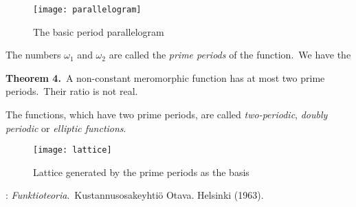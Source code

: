 \documentclass[12pt]{article}
\theoremstyle{definition}
\begin{document}
\begin{figure}
\begin{center}
\texttt{[image: parallelogram]}
\end{center}
\caption{The basic period parallelogram}
\end{figure}


The numbers $\omega_1$ and $\omega_2$ are called the {\em prime periods} of the function.\, We have the

\textbf{Theorem 4.}\, A non-constant meromorphic function has at most two prime periods.\, Their ratio is not real.

The functions, which have two prime periods, are called {\em two-periodic}, {\em doubly periodic} or {\em elliptic functions}.

\begin{figure}
\begin{center}
\texttt{[image: lattice]}
\end{center}
\caption{Lattice generated by the prime periods as the basis}
\end{figure}

\begin{thebibliography}{9}
: {\em Funktioteoria}.\, Kustannusosakeyhti\"o Otava. Helsinki (1963).
\end{thebibliography}

\end{document}
